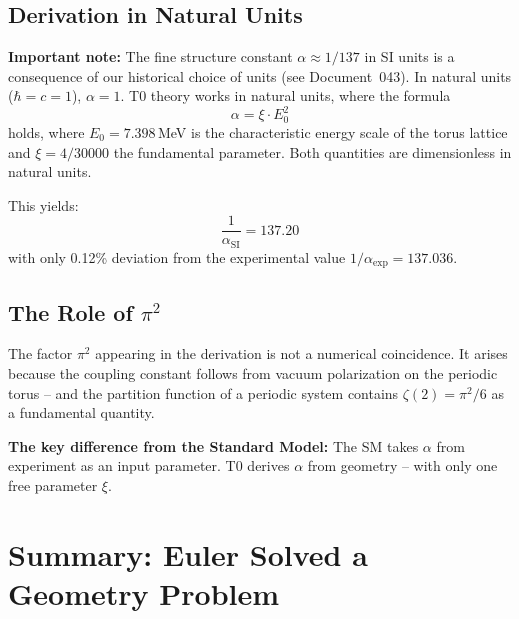 	\subsection{Derivation in Natural Units}
	
	\textbf{Important note:} The fine structure constant $\alpha \approx 1/137$ in SI units is a consequence of our historical choice of units (see Document~043). In natural units ($\hbar = c = 1$), $\alpha = 1$. T0 theory works in natural units, where the formula
	\begin{equation}
		\alpha = \xi \cdot E_0^2
		\label{eq:alpha-derivation}
	\end{equation}
	holds, where $E_0 = 7.398$\,MeV is the characteristic energy scale of the torus lattice and $\xi = 4/30000$ the fundamental parameter. Both quantities are dimensionless in natural units.
	
	This yields:
	\begin{equation}
		\frac{1}{\alpha_\text{SI}} = 137.20
	\end{equation}
	with only 0.12\% deviation from the experimental value $1/\alpha_\text{exp} = 137.036$.
	
	\subsection{The Role of $\pi^2$}
	
	The factor $\pi^2$ appearing in the derivation is not a numerical coincidence. It arises because the coupling constant follows from vacuum polarization on the periodic torus -- and the partition function of a periodic system contains $\zeta(2) = \pi^2/6$ as a fundamental quantity.
	
	\textbf{The key difference from the Standard Model:} The SM takes $\alpha$ from experiment as an input parameter. T0 derives $\alpha$ from geometry -- with only one free parameter $\xi$.


	\section{Summary: Euler Solved a Geometry Problem}
	
